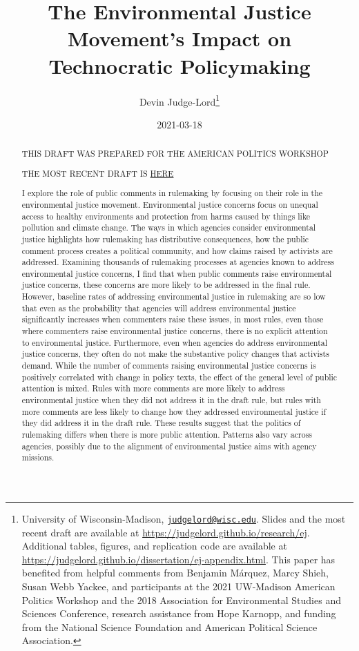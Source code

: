 \documentclass[
      12pt,
        ]{article}
\title{The Environmental Justice Movement's Impact on Technocratic Policymaking}
\author{ %
            Devin Judge-Lord\footnote{University of Wisconsin-Madison, \href{mailto:judgelord@wisc.edu}{\nolinkurl{judgelord@wisc.edu}}. Slides and the most recent draft are available at \url{https://judgelord.github.io/research/ej}. Additional tables, figures, and replication code are available at \url{https://judgelord.github.io/dissertation/ej-appendix.html}. This paper has benefited from helpful comments from Benjamin Márquez, Marcy Shieh, Susan Webb Yackee, and participants at the 2021 UW-Madison American Politics Workshop and the 2018 Association for Environmental Studies and Sciences Conference, research assistance from Hope Karnopp, and funding from the National Science Foundation and American Political Science Association.} 
            }
\date{2021-03-18}
\begin{document}
 


  \maketitle




  \begin{abstract}
    \noindent THIS DRAFT WAS PREPARED FOR THE AMERICAN POLITICS WORKSHOP

THE MOST RECENT DRAFT IS \href{https://judgelord.github.io/research/ej/}{HERE}

\bigskip

I explore the role of public comments in rulemaking by focusing on their role in the environmental justice movement. Environmental justice concerns focus on unequal access to healthy environments and protection from harms caused by things like pollution and climate change. The ways in which agencies consider environmental justice highlights how rulemaking has distributive consequences, how the public comment process creates a political community, and how claims raised by activists are addressed. Examining thousands of rulemaking processes at agencies known to address environmental justice concerns, I find that when public comments raise environmental justice concerns, these concerns are more likely to be addressed in the final rule. However, baseline rates of addressing environmental justice in rulemaking are so low that even as the probability that agencies will address environmental justice significantly increases when commenters raise these issues, in most rules, even those where commenters raise environmental justice concerns, there is no explicit attention to environmental justice. Furthermore, even when agencies do address environmental justice concerns, they often do not make the substantive policy changes that activists demand. While the number of comments raising environmental justice concerns is positively correlated with change in policy texts, the effect of the general level of public attention is mixed. Rules with more comments are more likely to address environmental justice when they did not address it in the draft rule, but rules with more comments are less likely to change how they addressed environmental justice if they did address it in the draft rule. These results suggest that the politics of rulemaking differs when there is more public attention. Patterns also vary across agencies, possibly due to the alignment of environmental justice aims with agency missions. 

    

  \end{abstract}
\end{document}
